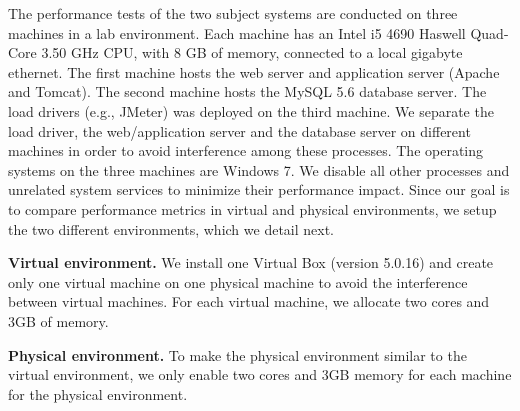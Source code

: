 The performance tests of the two subject systems are conducted on three machines in a lab environment. Each machine has an Intel i5 4690 Haswell Quad-Core 3.50 GHz CPU, with 8 GB of memory, connected to a local gigabyte ethernet. The first machine hosts the web server and application server (Apache and Tomcat). The second machine hosts the MySQL 5.6 database server. The load drivers (e.g., JMeter) was deployed on the third machine. We separate the load driver, the web/application server and the database server on different machines in order to avoid interference among these processes. The operating systems on the three machines are Windows 7. We disable all other processes and unrelated system services to minimize their performance impact. Since our goal is to compare performance metrics in virtual and physical environments, we setup the two different environments, which we detail next.

\noindent \textbf{Virtual environment.} We install one Virtual Box (version 5.0.16) and create only one virtual machine on one physical machine to avoid the interference between virtual machines. For each virtual machine, we allocate two cores and 3GB of memory. 


\noindent \textbf{Physical environment.} To make the physical environment similar to the virtual environment, we only enable two cores and 3GB memory for each machine for the physical environment. 


